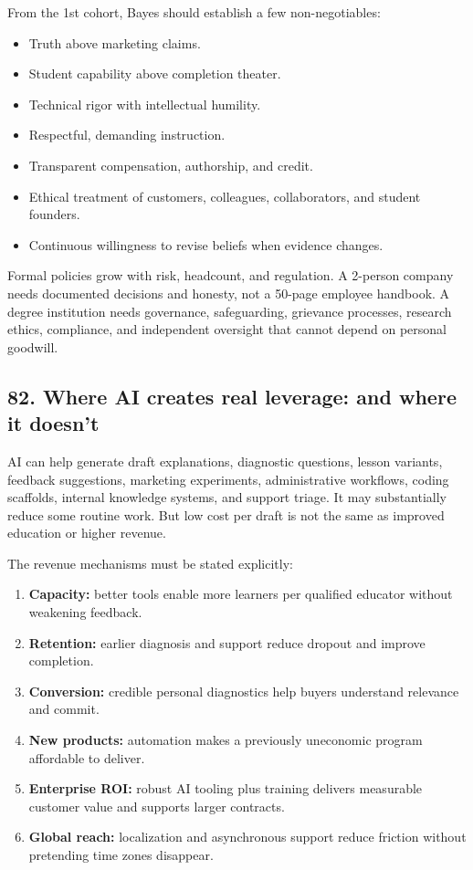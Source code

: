 From the 1st cohort, Bayes should establish a few non-negotiables:

\begin{itemize}[leftmargin=*,itemsep=1.5pt]
  \item Truth above marketing claims.
  \item Student capability above completion theater.
  \item Technical rigor with intellectual humility.
  \item Respectful, demanding instruction.
  \item Transparent compensation, authorship, and credit.
  \item Ethical treatment of customers, colleagues, collaborators, and student founders.
  \item Continuous willingness to revise beliefs when evidence changes.
\end{itemize}

Formal policies grow with risk, headcount, and regulation. A 2-person company needs documented decisions and honesty, not a 50-page employee handbook. A degree institution needs governance, safeguarding, grievance processes, research ethics, compliance, and independent oversight that cannot depend on personal goodwill.

\subsection{82. Where AI creates real leverage: and where it doesn't}

AI can help generate draft explanations, diagnostic questions, lesson variants, feedback suggestions, marketing experiments, administrative workflows, coding scaffolds, internal knowledge systems, and support triage. It may substantially reduce some routine work. But low cost per draft is not the same as improved education or higher revenue.

The revenue mechanisms must be stated explicitly:

\begin{enumerate}[leftmargin=*,itemsep=1.5pt]
  \item \textbf{Capacity:} better tools enable more learners per qualified educator without weakening feedback.
  \item \textbf{Retention:} earlier diagnosis and support reduce dropout and improve completion.
  \item \textbf{Conversion:} credible personal diagnostics help buyers understand relevance and commit.
  \item \textbf{New products:} automation makes a previously uneconomic program affordable to deliver.
  \item \textbf{Enterprise ROI:} robust AI tooling plus training delivers measurable customer value and supports larger contracts.
  \item \textbf{Global reach:} localization and asynchronous support reduce friction without pretending time zones disappear.
\end{enumerate}

